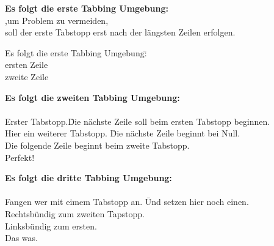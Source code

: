 \documentclass{scrartcl}
\begin{document}


\begin{tabbing}
\textbf{Es folgt die erste Tabbing Umgebung:} \= \\
\> ,um Problem zu vermeiden, \\
soll der erste Tabstopp erst nach der längsten Zeilen erfolgen.

\end{tabbing}




\begin{tabbing}
Es folgt die erste Tabbing Umgebung:\= \+\\
ersten Zeile\\
zweite Zeile\\ 
\end{tabbing}



\begin{tabbing}
\textbf{Es folgt die zweiten Tabbing Umgebung:}  \\ \\
Erster Tabstopp.\= Die nächste Zeile soll beim ersten Tabstopp beginnen.\+ \\ 
 Hier ein weiterer Tabstopp. \= Die nächste Zeile beginnt bei Null.\- \\
Die folgende Zeile beginnt beim zweite Tabstopp.\+\+ \\ 
 Perfekt!
\end{tabbing}


\begin{tabbing}
\textbf{Es folgt die dritte Tabbing Umgebung:}  \\ \\
Fangen wer mit eimem Tabstopp an. \= Und setzen hier noch einen. \= \\    
\>\>Rechtsbündig zum zweiten Tapstopp. \' \\
\> Linksbündig zum ersten.\\
\>\> Das was.
\end{tabbing}
\end{document}
